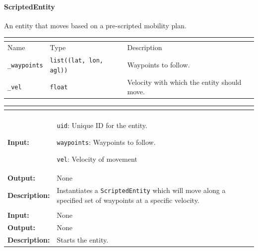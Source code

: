 \documentclass[titlepage]{article}
\renewenvironment{itemize*}
    {\begin{itemize}
        \setlength{\itemsep}{0pt}%
        \setlength{\parskip}{0pt}%
        \setlength{\partopsep}{0pt}%
        \setlength{\topsep}{0pt}}%
    {\end{itemize}}
\newcommand{\operations}[1]{
\begin{center}
    \begin{longtable}{|p{4cm}|p{10cm + 2.0\tabcolsep}|}
    \hline
    \multicolumn{2}{|l|}{\cellcolor[gray]{0.5}{\textbf{Operations}}} \\ \hline
#1
    \end{longtable}
\end{center}
}
\newcommand{\operation}[4]{
    \hline
    \multicolumn{2}{|l|}{\cellcolor[gray]{0.8}{\texttt{#1}}} \\ \hline
    \hspace{7pt}\textbf{Input:} & #2 \\ \hline
    \hspace{7pt}\textbf{Output:} & #3 \\ \hline
    \hspace{7pt}\textbf{Description:} & #4 \\ \hline
}
\newcommand{\attributes}[1]{
    \begin{center}
        \begin{tabular}{|p{3.5cm}|p{3.5cm}|p{7cm}|}
            \multicolumn{3}{|l|}{\cellcolor[gray]{0.5}{\textbf{Attributes}}} \\ \hline
            \rowcolor[gray]{0.8} Name & Type & Description \\ \hline 
            #1
        \end{tabular}
    \end{center}
}
\newcommand{\attribute}[3]{
    \texttt{#1} & \texttt{#2} & #3 \\ \hline
}
\begin{document}
\paragraph{ScriptedEntity}{An entity that moves based on a pre-scripted mobility plan.}

\attributes
{
    \attribute{\_waypoints}{list((lat, lon, agl))}{Waypoints to follow.}
    \attribute{\_vel}{float}{Velocity with which the entity should move.}
}

\operations
{
    \operation{\_\_init\_\_(uid, waypoints, vel)}{
        \begin{itemize*}
            \item \texttt{uid}: Unique ID for the entity.
            \item \texttt{waypoints}: Waypoints to follow.
            \item \texttt{vel}: Velocity of movement
        \end{itemize*}
    }{None}{Instantiates a \texttt{ScriptedEntity} which will move along a specified set of waypoints at a specific velocity.}
    \operation{run()}{None}{None}{Starts the entity.}
}
\end{document}
